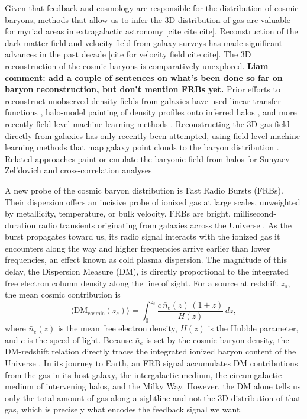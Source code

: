 \documentclass[twocolumn]{aastex631}
\begin{document}
Given that feedback and cosmology are responsible for 
the distribution of cosmic baryons, methods that allow us to infer the 3D distribution of gas are valuable for 
myriad areas in extragalactic astronomy [cite cite cite]. Reconstruction of the dark matter field and velocity field from galaxy surveys has made significant advances in the past decade \citep{hong2021, Villanueva2021, mudur2022, park2023, shi2025_velocity, wang2023_velocity}[cite for velocity field cite cite]. The 3D reconstruction of the cosmic baryons is comparatively unexplored. \textbf{Liam comment: add a couple of sentences on what's been done so far on baryon reconstruction, but don't mention FRBs yet.}
Prior efforts to reconstruct unobserved density fields from galaxies have used linear transfer functions \citep{liu2025, sharma2024_linear_transfer}, halo-model painting of density profiles onto inferred halos \citep{sehgal2010,stein2018,Stein_2020,Yasini2020}, and more recently field-level machine-learning methods \citep{ono2024, park2023,wang2023_velocity, shi2025_velocity}.
Reconstructing the 3D gas field directly from galaxies has only recently been attempted, using field-level machine-learning methods that map galaxy point clouds to the baryon distribution \citep{kvasiuk2024, Krywonos2026}. Related approaches paint or emulate the baryonic field from halos for Sunyaev-Zel'dovich and cross-correlation analyses \citep{liu2025, sharma2024_linear_transfer}



A new probe of the cosmic baryon distribution is Fast Radio Bursts (FRBs). Their 
dispersion offers an incisive probe of ionized gas at 
large scales, unweighted by metallicity, temperature, 
or bulk velocity.
FRBs are bright, millisecond-duration radio transients originating from galaxies across the Universe \citep{lorimer2007, petroffreview}. As the burst propagates toward us, its radio signal interacts with the ionized gas it encounters along the way and higher frequencies arrive earlier than lower frequencies, an effect known as cold plasma dispersion. The magnitude of this delay, the Dispersion Measure (DM), is directly proportional to the integrated free electron column density along the line of sight. For a source at redshift $z_s$, the mean cosmic contribution is
\begin{equation}
    \langle \mathrm{DM_{cosmic}}(z_s) \rangle = \int_0^{z_s} \frac{c \, \bar{n}_e(z) \, (1+z)}{H(z)} \, dz,
\end{equation}
where $\bar{n}_e(z)$ is the mean free electron density, $H(z)$ is the Hubble parameter, and $c$ is the speed of light. Because $\bar{n}_e$ is set by the cosmic baryon density, the DM-redshift relation directly traces the integrated ionized baryon content of the Universe \citep{macquart2020}. In its journey to Earth, an FRB signal accumulates DM contributions from the gas in its host galaxy, the intergalactic medium, the circumgalactic medium of intervening halos, and the Milky Way. However, the DM alone tells us only the total amount of gas along a sightline and not the 3D distribution of that gas, which is precisely what encodes the feedback signal we want.
\end{document}
